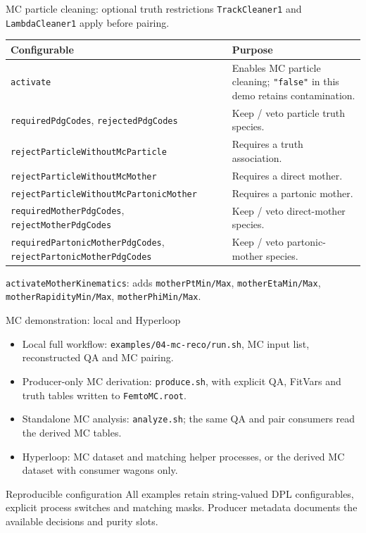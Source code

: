 \begin{frame}{MC particle cleaning: optional truth restrictions}
 \footnotesize \texttt{TrackCleaner1} and \texttt{LambdaCleaner1} apply before pairing.
 \renewcommand{\arraystretch}{1.18}
 \begin{tabular}{p{}p{}}
 \toprule
 Configurable & Purpose\\\midrule
 \texttt{activate} & Enables MC particle cleaning; \texttt{"false"} in this demo retains contamination.\\
 \texttt{requiredPdgCodes}, \texttt{rejectedPdgCodes} & Keep / veto particle truth species.\\
 \texttt{rejectParticleWithoutMcParticle} & Requires a truth association.\\
 \texttt{rejectParticleWithoutMcMother} & Requires a direct mother.\\
 \texttt{rejectParticleWithoutMcPartonicMother} & Requires a partonic mother.\\
 \texttt{requiredMotherPdgCodes}, \texttt{rejectMotherPdgCodes} & Keep / veto direct-mother species.\\
 \texttt{requiredPartonicMotherPdgCodes}, \texttt{rejectPartonicMotherPdgCodes} & Keep / veto partonic-mother species.\\\bottomrule
 \end{tabular}
 \par\medskip
 \texttt{activateMotherKinematics}: adds \texttt{motherPtMin/Max}, \texttt{motherEtaMin/Max}, \texttt{motherRapidityMin/Max}, \texttt{motherPhiMin/Max}.
\end{frame}

\begin{frame}{MC demonstration: local and Hyperloop}
 \begin{itemize}
 \item Local full workflow: \texttt{examples/04-mc-reco/run.sh}, MC input list, reconstructed QA and MC pairing.
 \item Producer-only MC derivation: \texttt{produce.sh}, with explicit QA, FitVars and truth tables written to \texttt{FemtoMC.root}.
 \item Standalone MC analysis: \texttt{analyze.sh}; the same QA and pair consumers read the derived MC tables.
 \item Hyperloop: MC dataset and matching helper processes, or the derived MC dataset with consumer wagons only.
 \end{itemize}
 \begin{block}{Reproducible configuration}
 All examples retain string-valued DPL configurables, explicit process switches and matching masks. Producer metadata documents the available decisions and purity slots.
 \end{block}
\end{frame}
